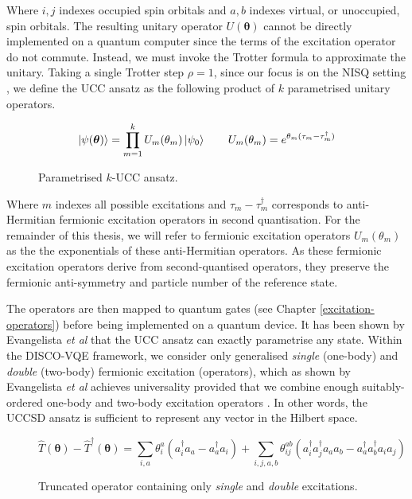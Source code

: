 Where $i, j$ indexes occupied spin orbitals and $a, b$ indexes virtual, or unoccupied, spin orbitals. The resulting unitary operator $U(\bm\theta)$ cannot be directly implemented on a quantum computer since the terms of the excitation operator do not commute. Instead, we must invoke the Trotter formula to approximate the unitary. Taking a single Trotter step $\rho=1$, since our focus is on the NISQ setting \cite{Cowtan2020}, we define the UCC ansatz as the following product of $k$ parametrised unitary operators.

\begin{figure}[H]
    \centering
    \begin{equation*}
        \ket{\psi(\bm\theta)} = \prod_{m=1}^k U_m(\theta_m) \ket{\psi_0} \qquad
        U_m(\theta_m) = e^{\theta_m (\tau_m - \tau_m^\dagger)}
    \end{equation*}
    \caption{Parametrised $k$-UCC ansatz.}
\end{figure}

Where $m$ indexes all possible excitations and $\tau_m - \tau_m^\dagger$ corresponds to anti-Hermitian fermionic excitation operators in second quantisation. For the remainder of this thesis, we will refer to fermionic excitation operators $U_m(\theta_m)$ as the the exponentials of these anti-Hermitian operators. As these fermionic excitation operators derive from second-quantised operators, they preserve the fermionic anti-symmetry and particle number of the reference state.

The operators are then mapped to quantum gates (see Chapter \ref{excitation-operators}) before being implemented on a quantum device. It has been shown by Evangelista \textit{et al} \cite{Evangelista2019} that the UCC ansatz can exactly parametrise any state. Within the DISCO-VQE framework, we consider only generalised \textit{single} (one-body) and \textit{double } (two-body) fermionic excitation (operators), which as shown by Evangelista \textit{et al} \cite{Evangelista2019} achieves universality provided that we combine enough suitably-ordered one-body and two-body excitation operators \cite{Burton2023}. In other words, the UCCSD ansatz is sufficient to represent any vector in the Hilbert space.

\begin{figure}[H]
    \centering
    \begin{equation*}
    \hat T(\bm{\theta}) - \hat T^{\dagger}(\bm{\theta}) =
    \sum_{i, a} \theta^a_i (a^\dagger_i a_a - a^\dagger_a a_i) + 
    \sum_{i, j, a, b} \theta^{ab}_{ij} (a^\dagger_i a^\dagger_j a_a a_b - a^\dagger_a a^\dagger_b a_i a_j)
    \end{equation*}
    \caption{Truncated operator containing only \textit{single} and \textit{double} excitations.}
\end{figure}
